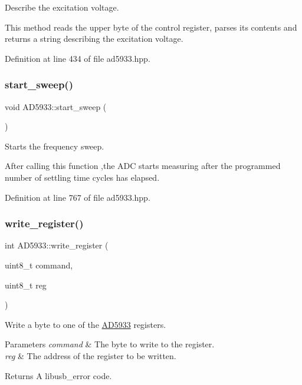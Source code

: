 Describe the excitation voltage. 

This method reads the upper byte of the control register, parses its contents and returns a string describing the excitation voltage. 

Definition at line 434 of file ad5933.\+hpp.

\mbox{\label{struct_a_d5933_ad9a52b2c0be2b9b638203329d404e3af}} 
\subsubsection{\texorpdfstring{start\+\_\+sweep()}{start\_sweep()}}
{\footnotesize\ttfamily void A\+D5933\+::start\+\_\+sweep (\begin{DoxyParamCaption}{ }\end{DoxyParamCaption})}



Starts the frequency sweep. 

After calling this function ,the A\+DC starts measuring after the programmed number of settling time cycles has elapsed. 

Definition at line 767 of file ad5933.\+hpp.

\mbox{\label{struct_a_d5933_a19776e361cd7e0f8139637a186d83f63}} 
\subsubsection{\texorpdfstring{write\+\_\+register()}{write\_register()}}
{\footnotesize\ttfamily int A\+D5933\+::write\+\_\+register (\begin{DoxyParamCaption}\item[{uint8\+\_\+t}]{command,  }\item[{uint8\+\_\+t}]{reg }\end{DoxyParamCaption})}



Write a byte to one of the \mbox{\hyperlink{struct_a_d5933}{A\+D5933}} registers. 


\begin{DoxyParams}{Parameters}
{\em command} & The byte to write to the register. \\
\hline
{\em reg} & The address of the register to be written. \\
\hline
\end{DoxyParams}
\begin{DoxyReturn}{Returns}
A libusb\+\_\+error code. 
\end{DoxyReturn}



